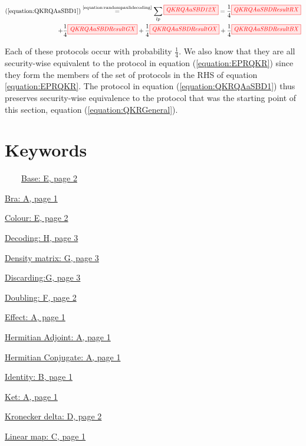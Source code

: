 \documentclass[]{article}
\newcommand{\equaltext}[1]{\ensuremath{\stackrel{\text{#1}}{=}}}
\begin{document}
\begin{equation}
	\label{equation:QKRQAaSBDResult}
	\begin{aligned}
	(\ref{equation:QKRQAaSBD1}) \equaltext{\ref{equation:randompaulidecoding}}
	\sum\limits_{lp}\tikzfig{QKRQAaSBD12X} = \frac{1}{4}\tikzfig{QKRQAaSBDResultRX} \\+
	\frac{1}{4}\tikzfig{QKRQAaSBDResultGX} +
	\frac{1}{4}\tikzfig{QKRQAaSBDResultOX} +
	\frac{1}{4}\tikzfig{QKRQAaSBDResultBX}
	\end{aligned}
\end{equation}

Each of these protocols occur with probability $\frac{1}{4}$. We also know that they are all security-wise equivalent to the protocol in equation (\ref{equation:EPRQKR}) since they form the members of the set of protocols in the RHS of equation \ref{equation:EPRQKR}. The protocol in equation (\ref{equation:QKRQAaSBD1}) thus preserves security-wise equivalence to the protocol that was the starting point of this section, equation (\ref{equation:QKRGeneral}).



\appendix


\section{Keywords}
\label{Keywords}


~~~~\hyperref[coloursandbases]{Base: E, page 2}

\hyperref[braandket]{Bra: A, page 1}

\hyperref[coloursandbases]{Colour: E, page 2}

\hyperref[phasespiders]{Decoding: H, page 3}

\hyperref[discarding]{Density matrix: G, page 3}

\hyperref[discarding]{Discarding:G, page 3}

\hyperref[doubling]{Doubling: F, page 2}

\hyperref[braandket]{Effect: A, page 1}

\hyperref[braandket]{Hermitian Adjoint: A, page 1}

\hyperref[braandket]{Hermitian Conjugate: A, page 1}

\hyperref[identity]{Identity: B, page 1}

\hyperref[braandket]{Ket: A, page 1}

\hyperref[spiders]{Kronecker delta: D, page 2}

\hyperref[maps]{Linear map: C, page 1}
\end{document}
